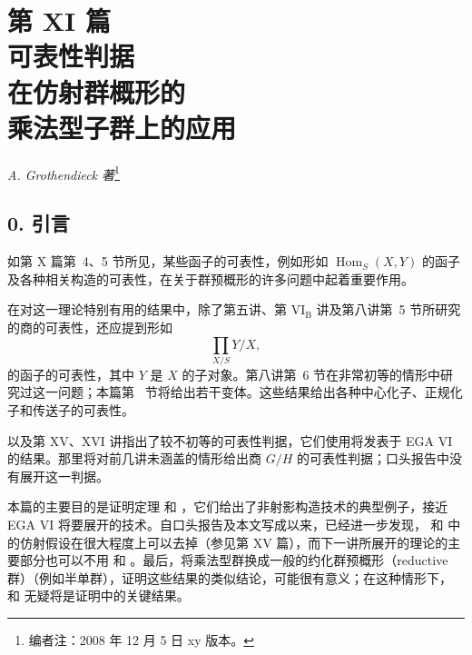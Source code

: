 
\setcounter{footnote}{-1} \chapter*{第 XI 篇\\可表性判据\\在仿射群概形的\\乘法型子群上的应用}

\begin{center}\textit{A. Grothendieck 著}\footnote{编者注：2008 年 12 月 5 日 xy 版本。}\end{center}

\section*{0. 引言}

如第 X 篇第~4、5 节所见，某些函子的可表性，例如形如 \(\operatorname{Hom}_S(X,Y)\) 的函子及各种相关构造的可表性，在关于群预概形的许多问题中起着重要作用。

在对这一理论特别有用的结果中，除了第五讲、第 \(\mathrm{VI}_{\mathrm B}\) 讲及第八讲第~5 节所研究的商的可表性，还应提到形如 \[
  \prod_{X/S} Y/X ,
\] 的函子的可表性，其中 \(Y\) 是 \(X\) 的子对象。第八讲第~6 节在非常初等的情形中研究过这一问题；本篇第~ 节将给出若干变体。这些结果给出各种中心化子、正规化子和传送子的可表性。

 以及第 XV、XVI 讲指出了较不初等的可表性判据，它们使用将发表于 EGA VI 的结果。那里将对前几讲未涵盖的情形给出商 \(G/H\) 的可表性判据；口头报告中没有展开这一判据。

本篇的主要目的是证明定理  和 ，它们给出了非射影构造技术的典型例子，接近 EGA VI 将要展开的技术。自口头报告及本文写成以来，已经进一步发现， 和  中的仿射假设在很大程度上可以去掉（参见第 XV 篇），而下一讲所展开的理论的主要部分也可以不用  和 。最后，将乘法型群换成一般的约化群预概形（reductive 群）（例如半单群），证明这些结果的类似结论，可能很有意义；在这种情形下， 和  无疑将是证明中的关键结果。

